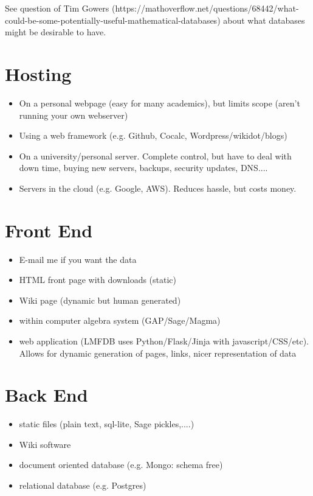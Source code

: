 \documentclass{article}
\begin{document}
See question of Tim Gowers (https://mathoverflow.net/questions/68442/what-could-be-some-potentially-useful-mathematical-databases) about what databases might be desirable to have.

\section{Hosting}

\begin{itemize}
\item On a personal webpage (easy for many academics), but limits scope (aren't running your own webserver)
\item Using a web framework (e.g. Github, Cocalc, Wordpress/wikidot/blogs)
\item On a university/personal server.  Complete control, but have to deal with down time, buying new servers, backups, security updates, DNS....
\item Servers in the cloud (e.g. Google, AWS).  Reduces hassle, but costs money.
\end{itemize}

\section{Front End}

\begin{itemize}
\item E-mail me if you want the data
\item HTML front page with downloads (static)
\item Wiki page (dynamic but human generated)
\item within computer algebra system (GAP/Sage/Magma)
\item web application (LMFDB uses Python/Flask/Jinja with javascript/CSS/etc).  Allows for dynamic generation of pages, links, nicer representation of data
\end{itemize}

\section{Back End}

\begin{itemize}
\item static files (plain text, sql-lite, Sage pickles,....)
\item Wiki software
\item document oriented database (e.g. Mongo: schema free)
\item relational database (e.g. Postgres)
\end{itemize}
\end{document}
